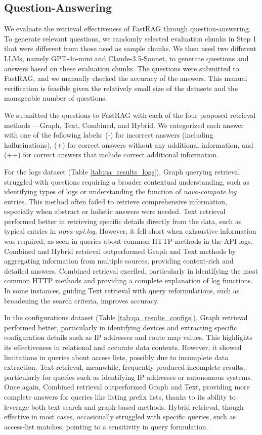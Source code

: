 \documentclass[conference]{IEEEtran}
\begin{document}
\subsection{Question-Answering}
We evaluate the retrieval effectiveness of FastRAG through question-answering. 
To generate relevant questions, we randomly selected evaluation chunks in Step 1 that were different from those used as sample chunks. We then used two different LLMs, namely GPT-4o-mini and Claude-3.5-Sonnet, to generate questions and answers based on these evaluation chunks. 
The questions were submitted to FastRAG, and we manually checked the accuracy of the answers. This manual verification is feasible given the relatively small size of the datasets and the manageable number of questions.

We submitted the questions to FastRAG with each of the four proposed retrieval methods —Graph, Text, Combined, and Hybrid.
We categorized each answer with one of the following labels:
(-) for incorrect answers (including hallucinations),
(+) for correct answers without any additional information, and
(++) for correct answers that include correct additional information. 

For the logs dataset (Table \ref{tab:qa_results_logs}), Graph querying retrieval struggled with questions requiring a broader contextual understanding, such as identifying types of logs or understanding the function of \textit{nova-compute.log} entries. This method often failed to retrieve comprehensive information, especially when abstract or holistic answers were needed. Text retrieval performed better in retrieving specific details directly from the data, such as typical entries in \textit{nova-api.log}. However, it fell short when exhaustive information was required, as seen in queries about common HTTP methods in the API logs. Combined and Hybrid retrieval outperformed Graph and Text methods by aggregating information from multiple sources, providing context-rich and detailed answers. Combined retrieval excelled, particularly in identifying the most common HTTP methods and providing a complete explanation of log functions. In some instances, guiding Text retrieval with query reformulations, such as broadening the search criteria, improves accuracy.

In the configurations dataset (Table \ref{tab:qa_results_configs}), Graph retrieval performed better, particularly in identifying devices and extracting specific configuration details such as IP addresses and route map values. This highlights its effectiveness in relational and accurate data contexts. However, it showed limitations in queries about access lists, possibly due to incomplete data extraction. Text retrieval, meanwhile, frequently produced incomplete results, particularly for queries such as identifying IP addresses or autonomous systems. Once again, Combined retrieval outperformed Graph and Text, providing more complete answers for queries like listing prefix lists, thanks to its ability to leverage both text search and graph-based methods. 
Hybrid retrieval, though effective in most cases, occasionally struggled with specific queries, such as access-list matches, pointing to a sensitivity in query formulation. 
\end{document}
